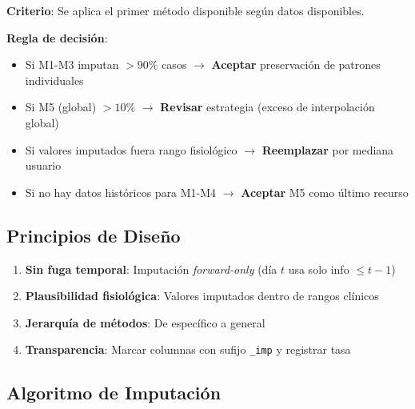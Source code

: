 \documentclass[12pt,letterpaper,twoside]{report}
\begin{document}
\begin{calculobox}
\begin{estadisticobox}
\textbf{Criterio}: Se aplica el primer método disponible según datos disponibles.
\end{estadisticobox}

\begin{reglabox}
\textbf{Regla de decisión}:

\begin{itemize}[noitemsep]
    \item Si M1-M3 imputan $> 90\%$ casos $\to$ \textbf{Aceptar} preservación de patrones individuales
    \item Si M5 (global) $> 10\%$ $\to$ \textbf{Revisar} estrategia (exceso de interpolación global)
    \item Si valores imputados fuera rango fisiológico $\to$ \textbf{Reemplazar} por mediana usuario
    \item Si no hay datos históricos para M1-M4 $\to$ \textbf{Aceptar} M5 como último recurso
\end{itemize}
\end{reglabox}

\subsection{Principios de Diseño}

\begin{enumerate}[noitemsep]
    \item \textbf{Sin fuga temporal}: Imputación \textit{forward-only} (día $t$ usa solo info $\leq t-1$)
    \item \textbf{Plausibilidad fisiológica}: Valores imputados dentro de rangos clínicos
    \item \textbf{Jerarquía de métodos}: De específico a general
    \item \textbf{Transparencia}: Marcar columnas con sufijo \texttt{\_imp} y registrar tasa
\end{enumerate}

\subsection{Algoritmo de Imputación}


\end{calculobox}
\end{document}
